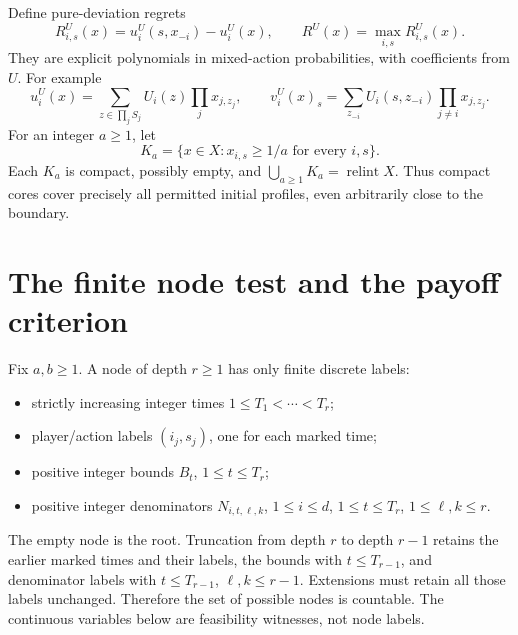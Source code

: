 \documentclass[11pt,a4paper]{article}
\newcommand{\ri}{\operatorname{relint}}
\begin{document}
Define pure-deviation regrets
\begin{equation}
R_{i,s}^U(x)=u_i^U(s,x_{-i})-u_i^U(x),\qquad
R^U(x)=\max_{i,s}R_{i,s}^U(x).
\label{eq:r}
\end{equation}
They are explicit polynomials in mixed-action probabilities, with coefficients
from \(U\). For example
\begin{equation}
u_i^U(x)=\sum_{z\in\prod_jS_j}U_i(z)\prod_jx_{j,z_j},
\qquad
v_i^U(x)_s=\sum_{z_{-i}}U_i(s,z_{-i})\prod_{j\ne i}x_{j,z_j}.
\label{eq:p}
\end{equation}
For an integer \(a\ge1\), let
\begin{equation}
K_a=\{x\in X:x_{i,s}\ge1/a\text{ for every }i,s\}.
\label{eq:k}
\end{equation}
Each \(K_a\) is compact, possibly empty, and
\(\bigcup_{a\ge1}K_a=\ri X\). Thus compact cores cover precisely all
permitted initial profiles, even arbitrarily close to the boundary.

\section{The finite node test and the payoff criterion}

Fix \(a,b\ge1\). A node of depth \(r\ge1\) has only finite discrete labels:
\begin{itemize}
\item strictly increasing integer times \(1\le T_1<\cdots<T_r\);
\item player/action labels \((i_j,s_j)\), one for each marked time;
\item positive integer bounds \(B_t\), \(1\le t\le T_r\);
\item positive integer denominators \(N_{i,t,\ell,k}\),
\(1\le i\le d\), \(1\le t\le T_r\), \(1\le\ell,k\le r\).
\end{itemize}
The empty node is the root. Truncation from depth \(r\) to depth \(r-1\)
retains the earlier marked times and their labels, the bounds with
\(t\le T_{r-1}\), and denominator labels with \(t\le T_{r-1}\), \(\ell,k\le r-1\).
Extensions must retain all those labels unchanged. Therefore the set of
possible nodes is countable. The continuous variables below are feasibility
witnesses, not node labels.
\end{document}
